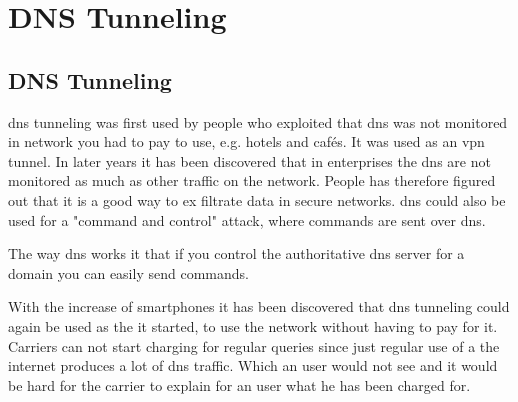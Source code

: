 \chapter{DNS Tunneling}
\label{chp:dns_tunneling}



\section{DNS Tunneling}

\Gls{dns} tunneling was first used by people who exploited that \Gls{dns} was not monitored in network you had to pay to use, e.g. hotels and cafés. It was used as an \Gls{vpn} tunnel. In later years it has been discovered that in enterprises the \Gls{dns} are not monitored as much as other traffic on the network. People has therefore figured out that it is a good way to ex filtrate data in secure networks. \Gls{dns} could also be used for a "command and control" attack, where commands are sent over \Gls{dns}.

The way \Gls{dns} works it that if you control the authoritative \Gls{dns} server for a domain you can easily send commands. 


With the increase of smartphones it has been discovered that \Gls{dns} tunneling could again be used as the it started, to use the network without having to pay for it. Carriers can not start charging for regular queries since just regular use of a the internet produces a lot of \Gls{dns} traffic. Which an user would not see and it would be hard for the carrier to explain for an user what he has been charged for. 